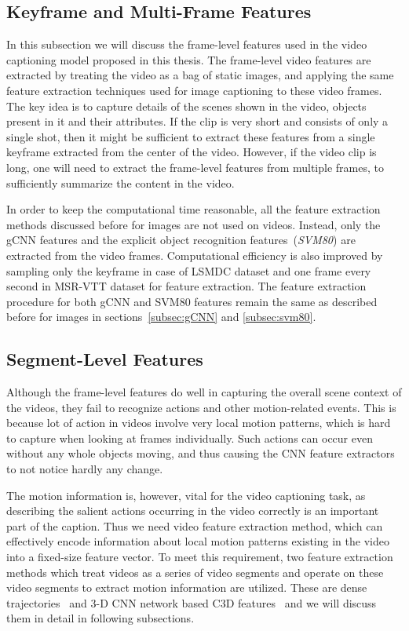 \subsection{Keyframe and Multi-Frame Features}
In this subsection we will discuss the frame-level features used in the video
captioning model proposed in this thesis.
The frame-level video features are extracted by treating the video as a bag of
static images, and applying the same feature extraction techniques used for
image captioning to these video frames.
The key idea is to capture details of the scenes shown in the video, objects
present in it and their attributes.
If the clip is very short and consists of only a single shot, then it might be
sufficient to extract these features from a single keyframe extracted from the
center of the video. 
However, if the video clip is long, one will need to extract the frame-level
features from multiple frames, to sufficiently summarize the content in the
video.

In order to keep the computational time reasonable, all the feature extraction
methods discussed before for images are not used on videos.
Instead, only the gCNN features and the explicit object recognition
features~(\emph{SVM80}) are extracted from the video frames.
Computational efficiency is also improved by sampling only the keyframe in case
of LSMDC dataset and one frame every second in MSR-VTT dataset for feature
extraction.
The feature extraction procedure for both gCNN and SVM80 features remain the
same as described before for images in sections~\ref{subsec:gCNN} and
\ref{subsec:svm80}. 

\subsection{Segment-Level Features}
Although the frame-level features do well in capturing the overall scene
context of the videos, they fail to recognize actions and other motion-related
events.
This is because lot of action in videos involve very local motion patterns,
which is hard to capture when looking at frames individually.
Such actions can occur even without any whole objects moving, and thus causing
the CNN feature extractors to not notice hardly any change.

The motion information is, however, vital for the video captioning task, as
describing the salient actions occurring in the video correctly is an important
part of the caption.
Thus we need video feature extraction method, which can effectively encode
information about local motion patterns existing in the video into a fixed-size
feature vector.
To meet this requirement, two feature extraction methods which treat videos as a
series of video segments and operate on these video segments to extract motion
information are utilized.
These are dense trajectories~\cite{DBLP:conf/cvpr/WangKSL11, Wang2013} and 3-D CNN
network based C3D features~\cite{DBLP:C3D} and we will discuss them in detail in
following subsections.

